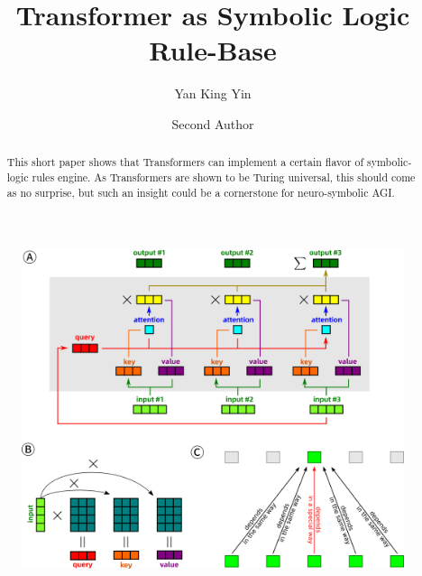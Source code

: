 \documentclass[runningheads]{llncs}
\begin{document}
%
\title{Transformer as Symbolic Logic Rule-Base}
%
%
\author{Yan King Yin \and
Second Author}
%
%
%
\maketitle              %
%
\begin{abstract}
This short paper shows that Transformers can implement a certain flavor of symbolic-logic rules engine.  As Transformers are shown to be Turing universal\cite{Wei2021}, this should come as no surprise, but such an insight could be a cornerstone for neuro-symbolic AGI.

\end{abstract}
%
%

\begin{figure}
	\includegraphics[scale=0.5]{fig1.png}
	\caption{}
	\label{fig1}
\end{figure}
\end{document}
